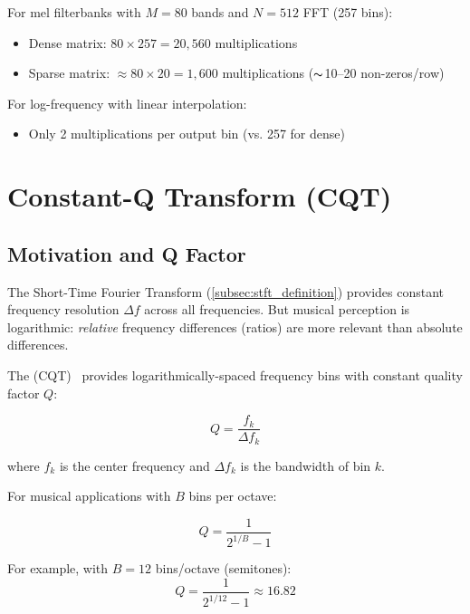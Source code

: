 For mel filterbanks with $M=80$ bands and $N=512$ FFT (257 bins):
\begin{itemize}
  \item Dense matrix: $80 \times 257 = 20{,}560$ multiplications
  \item Sparse matrix: $\approx 80 \times 20 = 1{,}600$
    multiplications ($\thicksim$10--20 non-zeros/row)
\end{itemize}

For log-frequency with linear interpolation:
\begin{itemize}
  \item Only 2 multiplications per output bin (vs. 257 for dense)
\end{itemize}

\section{Constant-Q Transform (CQT)}\label{sec:cqt}

\subsection{Motivation and Q Factor}\label{subsec:cqt_motivation}

The Short-Time Fourier Transform (\cref{subsec:stft_definition})
provides constant frequency resolution $\Delta f$ across all
frequencies. But musical perception is logarithmic: \emph{relative}
frequency differences (ratios) are more relevant than absolute differences.

The 
(CQT)~\cite{brown1991calculation,brown1992efficient} provides
logarithmically-spaced frequency bins with constant quality factor $Q$:

\begin{equation}
  \label{eq:q_factor}
  Q = \frac{f_k}{\Delta f_k}
\end{equation}

where $f_k$ is the center frequency and $\Delta f_k$ is the bandwidth
of bin $k$.

For musical applications with $B$ bins per octave:

\begin{equation}
  Q = \frac{1}{2^{1/B} - 1}
\end{equation}

For example, with $B=12$ bins/octave (semitones):
\begin{equation}
  Q = \frac{1}{2^{1/12} - 1} \approx 16.82
\end{equation}

